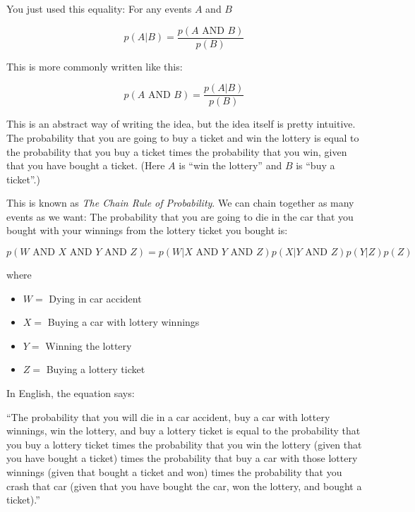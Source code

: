 You just used this equality: For any events $A$ and $B$

$$p(A | B) = \frac{p(A \text{ AND } B)}{p(B)}$$

This is more commonly written like this:

$$p(A \text{ AND } B) = \frac{p(A | B)}{p(B)}$$

This is an abstract way of writing the idea, but the idea itself
is pretty intuitive. The probability that you are going to buy a ticket
and win the lottery is equal to the probability that you buy a ticket
times the probability that you win, given that you have bought a ticket.
(Here $A$ is ``win the lottery'' and $B$ is ``buy a ticket''.)

This is known as \textit{The Chain Rule of Probability}.  We can
chain together as many events as we want: The probability that you are
going to die in the car that you bought with your winnings from the
lottery ticket you bought is:

$$p(W \text{ AND } X \text{ AND } Y \text{ AND } Z) = p( W | X \text{ AND } Y \text{ AND } Z) p( X |  Y \text{ AND } Z) p (Y | Z) p(Z)$$

where

\begin{itemize}
\item $W =$ Dying in car accident
\item $X =$ Buying a car with lottery winnings
\item $Y =$ Winning the lottery
\item $Z =$ Buying a lottery ticket
\end{itemize}

In English, the equation says:

``The probability that you will die in a car accident, buy a car with
lottery winnings, win the lottery, and buy a lottery ticket is equal
to the probability that you buy a lottery ticket times the probability
that you win the lottery (given that you have bought a ticket) times
the probability that buy a car with those lottery winnings (given that
bought a ticket and won) times the probability that you crash that car
(given that you have bought the car, won the lottery, and bought a
ticket).''




  
